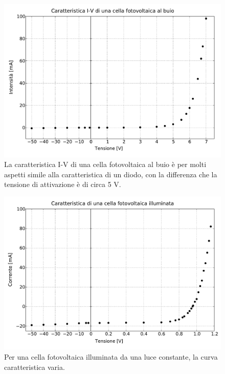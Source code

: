 \begin{figure}
    \includegraphics[scale=0.5]{buio.pdf}
    \caption{La caratteristica I-V di una cella fotovoltaica al buio è per molti aspetti simile alla caratteristica di un diodo,
        con la differenza che la tensione di attivazione è di circa 5 V.}
    \label{fig:buio}
\end{figure}

\begin{figure}
    \includegraphics[scale=0.5]{luce.pdf}
    \caption{Per una cella fotovoltaica illuminata da una luce constante, la curva caratteristica varia. }
    \label{fig:luce}
\end{figure}

